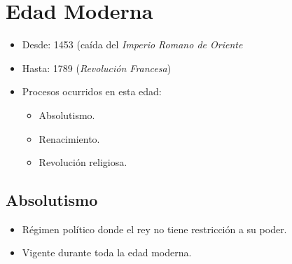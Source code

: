 \section{Edad Moderna}

\begin{itemize}

\item Desde: 1453 (caída del \emph{Imperio Romano de Oriente}
\item Hasta: 1789 (\emph{Revolución Francesa})

\item Procesos ocurridos en esta edad:
\begin{itemize}
	\item Absolutismo.
	\item Renacimiento.
	\item Revolución religiosa.
\end{itemize}

\end{itemize}

\subsection{Absolutismo}

\begin{itemize}

\item Régimen político donde el rey no tiene restricción a su poder.
\item Vigente durante toda la edad moderna.

\end{itemize}

\newpage

\newpage

\newpage


